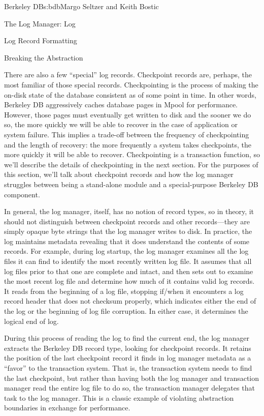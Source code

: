 \begin{aosachapter}{Berkeley DB}{s:bdb}{Margo Seltzer and Keith Bostic}
\begin{aosasect1}{The Log Manager: Log}
\begin{aosasect2}{Log Record Formatting}
\end{aosasect2}

\begin{aosasect2}{Breaking the Abstraction}

There are also a few ``special'' log records.  Checkpoint records are,
perhaps, the most familiar of those special records. Checkpointing is
the process of making the on-disk state of the database consistent as
of some point in time. In other words, Berkeley DB aggressively caches
database pages in Mpool for performance. However, those pages must
eventually get written to disk and the sooner we do so, the more
quickly we will be able to recover in the case of application or
system failure. This implies a trade-off between the frequency of
checkpointing and the length of recovery: the more frequently a system
takes checkpoints, the more quickly it will be able to
recover. Checkpointing is a transaction function, so we'll describe
the details of checkpointing in the next section.  For the purposes of
this section, we'll talk about checkpoint records and how the log
manager struggles between being a stand-alone module and a
special-purpose Berkeley DB component.

In general, the log manager, itself, has no notion of record types, so
in theory, it should not distinguish between checkpoint records and
other records---they are simply opaque byte strings that the log
manager writes to disk. In practice, the log maintains metadata
revealing that it does understand the contents of some records. For
example, during log startup, the log manager examines all the log
files it can find to identify the most recently written log file. It
assumes that all log files prior to that one are complete and intact,
and then sets out to examine the most recent log file and determine
how much of it contains valid log records. It reads from the beginning
of a log file, stopping if/when it encounters a log record header that
does not checksum properly, which indicates either the end of the log
or the beginning of log file corruption. In either case, it determines
the logical end of log.

During this process of reading the log to find the current end, the
log manager extracts the Berkeley DB record type, looking for
checkpoint records. It retains the position of the last checkpoint
record it finds in log manager metadata as a ``favor'' to the
transaction system. That is, the transaction system needs to find the
last checkpoint, but rather than having both the log manager and
transaction manager read the entire log file to do so, the transaction
manager delegates that task to the log manager. This is a classic
example of violating abstraction boundaries in exchange for
performance.


\end{aosasect2}
\end{aosasect1}
\end{aosachapter}
